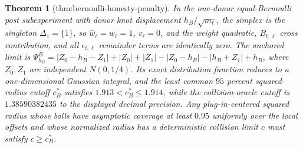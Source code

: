 \documentclass{article}
\newtheorem{theorem}{Theorem}
\begin{document}
\begin{theorem}[thm:bernoulli-honesty-penalty]\label{thm:bernoulli-honesty-penalty}
In the one-donor equal-Bernoulli post subexperiment with donor knot displacement \(h_B/\sqrt{m_\ell}\), the simplex is the singleton \(\Delta_1=\{1\}\), so \(\widehat w_\ell=w_\ell=1\), \(v_\ell=0\), and the weight quadratic, \(B_{t,\ell}\) cross contribution, and all \(\epsilon_{t,\ell}\) remainder terms are identically zero.  The anchored limit is \(\Psi^B_{h_B}=|Z_0-h_B-Z_1|+|Z_0|+|Z_1|-|Z_0-h_B|-|h_B+Z_1|+h_B\), where \(Z_0,Z_1\) are independent \(N(0,1/4)\).  Its exact distribution function reduces to a one-dimensional Gaussian integral, and the least common \(95\) percent squared-radius cutoff \(c_B^*\) satisfies \(1.913<c_B^*\leq1.914\), while the collision-oracle cutoff is \(1.38590382435\) to the displayed decimal precision.  Any plug-in-centered squared radius whose balls have asymptotic coverage at least \(0.95\) uniformly over the local offsets and whose normalized radius has a deterministic collision limit \(c\) must satisfy \(c\geq c_B^*\).
\end{theorem}
\end{document}
